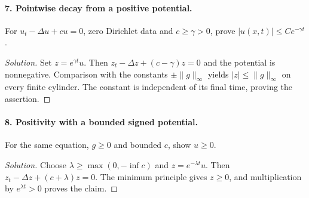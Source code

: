\Needspace{30mm}
\paragraph{7. Pointwise decay from a positive potential.}
For $u_t-\Delta u+cu=0$, zero Dirichlet data and $c\geq\gamma>0$, prove
$|u(x,t)|\leq C e^{-\gamma t}$.
\begin{proof}[Solution]
Set $z=e^{\gamma t}u$. Then $z_t-\Delta z+(c-\gamma)z=0$ and the
potential is nonnegative. Comparison with the constants
$\pm\|g\|_\infty$ yields $|z|\leq\|g\|_\infty$ on every finite cylinder.
The constant is independent of its final time, proving the assertion.
\end{proof}

\Needspace{30mm}
\paragraph{8. Positivity with a bounded signed potential.}
For the same equation, $g\geq0$ and bounded $c$, show $u\geq0$.
\begin{proof}[Solution]
Choose $\lambda\geq\max(0,-\inf c)$ and $z=e^{-\lambda t}u$.
Then $z_t-\Delta z+(c+\lambda)z=0$. The minimum principle gives $z\geq0$,
and multiplication by $e^{\lambda t}>0$ proves the claim.
\end{proof}

\Needspace{30mm}
